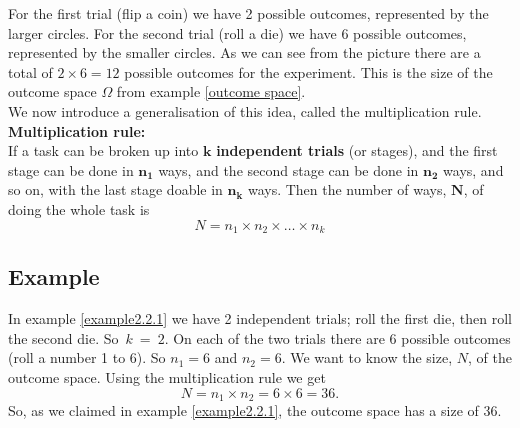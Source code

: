 \begin{center}
\end{center}

\noindent For the first trial (flip a coin) we have 2 possible outcomes, represented by the larger circles. For the second trial (roll a die) we have 6 possible outcomes, represented by the smaller circles. As we can see from the picture there are a total of $2\times6 = 12$ possible outcomes for the experiment. This is the size of the outcome space $\Omega$ from example \ref{outcome space}. \\

\noindent We now introduce a generalisation of this idea, called the multiplication rule. \\

\noindent \textbf{Multiplication rule:} \\
If a task can be broken up into $\mathbf{k}$ \textbf{independent trials} (or stages), and the first stage can be done in $\mathbf{n_1}$ ways, and the second stage can be done in $\mathbf{n_2}$ ways, and so on, with the last stage doable in $\mathbf{n_k}$ ways. Then the number of ways, $\mathbf{N}$, of doing the whole task is
\[
N = n_1\times n_2 \times \ldots \times n_k
\]
\subsection{Example} \label{ex3.0.9}
In example \ref{example2.2.1} we have 2 independent trials; roll the first die, then roll the second die. So~$k~=~2$. On each of the two trials there are 6 possible outcomes (roll a number 1 to 6). So $n_1 = 6$ and $n_2 = 6$. We want to know the size, $N$, of the outcome space. Using the multiplication rule we get
\[
N = n_1 \times n_2 = 6 \times 6 = 36.
\]
So, as we claimed in example \ref{example2.2.1}, the outcome space has a size of 36. \\

